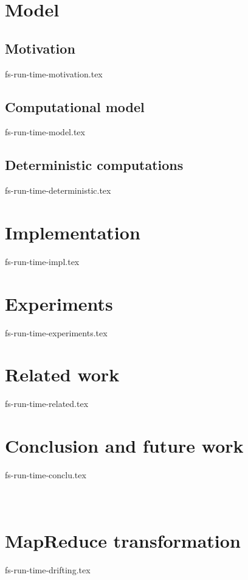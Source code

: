 \documentclass{llncs}
\begin{document}
\section {Model}
\label {fs-model}

\subsection {Motivation}
 {fs-run-time-motivation.tex}

\subsection {Computational model}
 {fs-run-time-model.tex}


\subsection {Deterministic computations}
 {fs-run-time-deterministic.tex}

\section {Implementation}
 {fs-run-time-impl.tex}

\section {Experiments}
 {fs-run-time-experiments.tex}

\section {Related work}
 {fs-run-time-related.tex}

\section {Conclusion and future work}
 {fs-run-time-conclu.tex}




\appendix
\section{\\MapReduce transformation}
 {fs-run-time-drifting.tex}
\end{document}
